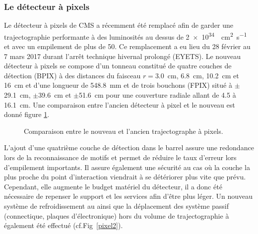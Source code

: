 \subsubsection{Le détecteur à pixels}
Le détecteur à pixels de CMS a récemment été remplacé afin de garder une trajectographie performante à des luminosités au dessus de \SI{2e34}{\per\square\centi\meter\per\second} et avec un empilement de plus de \num{50}. Ce remplacement a eu lieu du \num{28} février au \num{7} mars \num{2017} durant l'arrêt technique hivernal prolongé (EYETS). Le nouveau détecteur à pixels se compose d'un tonneau constitué de quatre couches de détection (BPIX) à des distances du faisceau $r=$\SI{3.0}{\centi\meter}, \SI{6.8}{\centi\meter}, \SI{10.2}{\centi\meter} et \SI{16}{\centi\meter} et d'une longueur de \SI{548.8}{\milli\meter} et de trois bouchons (FPIX) situé à $\pm$\SI{29.1}{\centi\meter}, $\pm$\SI{39.6}{\centi\meter} et $\pm$\SI{51.6}{\centi\meter} pour une couverture radiale allant de \num{4.5} à \SI{16.1}{\centi\meter}. Une comparaison entre l'ancien détecteur à pixel et le nouveau est donné figure \ref{pixel}.

	\begin{figure}[ht!]
	\hfill
	\caption{Comparaison entre le nouveau et l'ancien trajectographe à pixels.}
	\label{pixel}
\end{figure}

L'ajout d'une quatrième couche de détection dans le barrel assure une redondance lors de la reconnaissance de motifs et permet de réduire le taux d'erreur lors d'empilement importants. Il assure également une sécurité au cas où la couche la plus proche du point d'interaction viendrait à se détériorer plus vite que prévu. Cependant, elle augmente le budget matériel du détecteur, il a donc été nécessaire de repenser le support et les services afin d'être plus léger. Un nouveau système de refroidissement au  ainsi que la déplacement des système passif (connectique, plaques d'électronique) hors du volume de trajectographie à également été effectué (cf.Fig~\ref{pixel2}).

